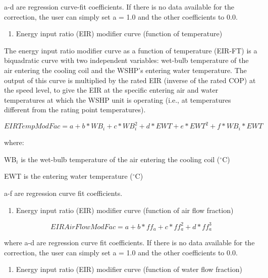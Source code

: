 a-d are regression curve-fit coefficients.  If there is no data available for the correction, the user can simply set a = 1.0 and the other coefficients to 0.0.

\begin{enumerate}
\def\labelenumi{\arabic{enumi})}
\setcounter{enumi}{3}
\tightlist
\item
  Energy input ratio (EIR) modifier curve (function of temperature)
\end{enumerate}

The energy input ratio modifier curve as a function of temperature (EIR-FT) is a biquadratic curve with two independent variables: wet-bulb temperature of the air entering the cooling coil and the WSHP's entering water temperature. The output of this curve is multiplied by the rated EIR (inverse of the rated COP) at the speed level, to give the EIR at the specific entering air and water temperatures at which the WSHP unit is operating (i.e., at temperatures different from the rating point temperatures).

\begin{equation}
EIRTempModFac = a + b*W{B_i} + c*WB_i^2 + d*EWT + e*EW{T^2} + f*W{B_i}*EWT
\end{equation}

where:

WB\(_{i}\) is the wet-bulb temperature of the air entering the cooling coil (\(^{\circ}\)C)

EWT is the entering water temperature (\(^{\circ}\)C)

a-f are regression curve fit coefficients.

\begin{enumerate}
\def\labelenumi{\arabic{enumi})}
\setcounter{enumi}{4}
\tightlist
\item
  Energy input ratio (EIR) modifier curve (function of air flow fraction)
\end{enumerate}

\begin{equation}
EIRAirFlowModFac = a + b*f{f_a} + c*ff_a^2 + d*ff_a^3
\end{equation}

where a-d are regression curve fit coefficients.  If there is no data available for the correction, the user can simply set a = 1.0 and the other coefficients to 0.0.

\begin{enumerate}
\def\labelenumi{\arabic{enumi})}
\setcounter{enumi}{5}
\tightlist
\item
  Energy input ratio (EIR) modifier curve (function of water flow fraction)
\end{enumerate}

